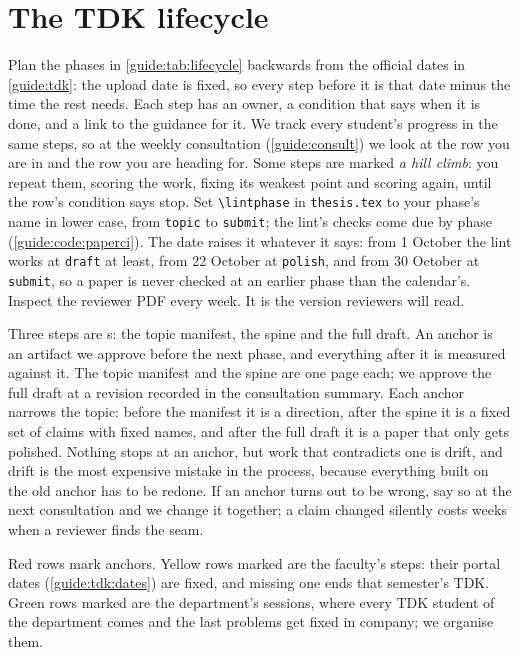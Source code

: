 \chapter{The TDK lifecycle}\label{guide:lifecycle}
Plan the phases in \cref{guide:tab:lifecycle} backwards from the official dates in \cref{guide:tdk}: the upload date is fixed, so every step before it is that date minus the time the rest needs. Each step has an owner, a condition that says when it is done, and a link to the guidance for it.
We track every student's progress in the same steps, so at the weekly consultation (\cref{guide:consult}) we look at the row you are in and the row you are heading for. Some steps are marked \emph{a hill climb}: you repeat them, scoring the work, fixing its weakest point and scoring again, until the row's condition says stop.
Set \texttt{\textbackslash lintphase} in \texttt{thesis.tex} to your phase's name in lower case, from \texttt{topic} to \texttt{submit}; the lint's checks come due by phase (\cref{guide:code:paperci}). The date raises it whatever it says: from 1 October the lint works at \texttt{draft} at least, from 22 October at \texttt{polish}, and from 30 October at \texttt{submit}, so a paper is never checked at an earlier phase than the calendar's.
Inspect the reviewer PDF every week. It is the version reviewers will read.

Three steps are \anchor{}s: the topic manifest, the spine and the full draft. An anchor is an artifact we approve before the next phase, and everything after it is measured against it. The topic manifest and the spine are one page each; we approve the full draft at a revision recorded in the consultation summary. Each anchor narrows the topic: before the manifest it is a direction, after the spine it is a fixed set of claims with fixed names, and after the full draft it is a paper that only gets polished. Nothing stops at an anchor, but work that contradicts one is drift, and drift is the most expensive mistake in the process, because everything built on the old anchor has to be redone. If an anchor turns out to be wrong, say so at the next consultation and we change it together; a claim changed silently costs weeks when a reviewer finds the seam.

Red rows mark anchors. Yellow rows marked \official{} are the faculty's steps: their portal dates (\cref{guide:tdk:dates}) are fixed, and missing one ends that semester's TDK. Green rows marked \department{} are the department's sessions, where every TDK student of the department comes and the last problems get fixed in company; we organise them.

